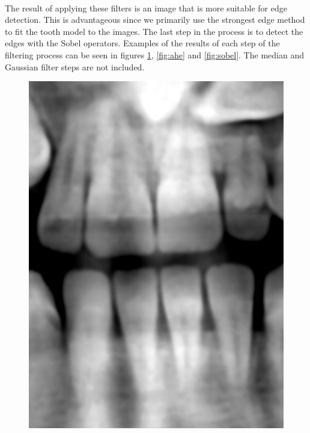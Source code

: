 \documentclass[11pt]{article}
\begin{document}
~\\
The result of applying these filters is an image that is more suitable for edge detection. This is advantageous since we primarily use the strongest edge method to fit the tooth model to the images. The last step in the process is to detect the edges with the Sobel operators. Examples of the results of each step of the filtering process can be seen in figures \ref{fig:hat}, \ref{fig:ahe} and \ref{fig:sobel}. The median and Gaussian filter steps are not included.

\begin{figure}[H]
\centering
\begin{minipage}{.30\textwidth}
  \centering
  \includegraphics[width=\linewidth]{HATcropped}
  \captionsetup{justification=centering}
  \label{fig:hat}
\end{minipage}%
\hspace{1em}
\begin{minipage}{.30\textwidth}

\end{minipage}
\end{figure}
\end{document}
